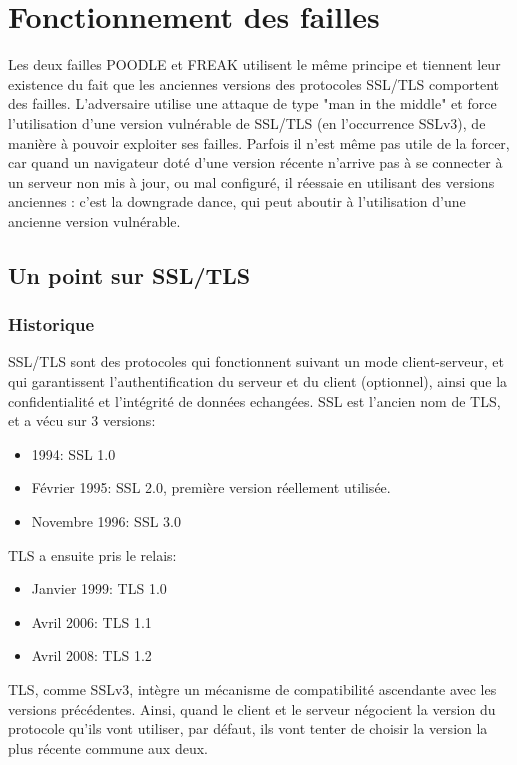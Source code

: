 \section{Fonctionnement des failles}


Les deux failles POODLE et FREAK utilisent le m\^eme principe et tiennent leur existence du fait que les anciennes versions des protocoles SSL/TLS comportent des failles. L'adversaire utilise une attaque de type "man in the middle" et force l'utilisation d'une version vulnérable de SSL/TLS (en l'occurrence SSLv3), de manière à pouvoir exploiter ses failles. Parfois il n'est m\^eme pas utile de la forcer, car quand un navigateur doté d’une version récente n’arrive pas à se connecter à un serveur non mis à jour, ou mal configuré, il réessaie en utilisant des versions anciennes : c’est la downgrade dance, qui peut aboutir à l'utilisation d'une ancienne version vulnérable.

\subsection{Un point sur SSL/TLS}

\subsubsection{Historique}

SSL/TLS sont des protocoles qui fonctionnent suivant un mode client-serveur, et qui garantissent l'authentification du serveur et du client (optionnel), ainsi que la confidentialité et l'intégrité de données echangées. SSL est l'ancien nom de TLS, et a vécu sur 3 versions:
\begin{itemize}
\item 1994: SSL 1.0
\item Février 1995: SSL 2.0, première version réellement utilisée.
\item Novembre 1996: SSL 3.0 
\end{itemize}
TLS a ensuite pris le relais: 
\begin{itemize}
\item Janvier 1999: TLS 1.0
\item Avril 2006: TLS 1.1
\item Avril 2008: TLS 1.2
\end{itemize}
TLS, comme SSLv3, intègre un mécanisme de compatibilité ascendante avec les versions précédentes. Ainsi, quand le client et le serveur négocient la version du protocole qu'ils vont utiliser, par défaut, ils vont tenter de choisir la version la plus récente commune aux deux. 

